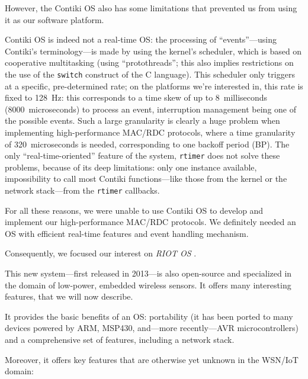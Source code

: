 \documentclass[a4paper,twoside]{article}
\begin{document}
\bigskip

However, the Contiki OS also has some limitations that prevented us from
using it as our software platform.

Contiki OS is indeed not a real-time OS: the processing of ``events''---using
Contiki's terminology---is made by using the kernel's scheduler, which is
based on cooperative multitasking (using ``protothreads''; this also implies
restrictions on the use of the \texttt{switch} construct of the C language).
This scheduler only triggers at a specific, pre-determined rate; on
the platforms we're interested in, this rate is fixed to 128~Hz:
this corresponds to a time skew of up to 8~milliseconds
(8000~microseconds) to process an event, interruption management being
one of the possible events. Such a large granularity is clearly
a huge problem when implementing high-performance MAC/RDC protocols,
where a time granularity of 320~microseconds is needed, corresponding
to one backoff period (BP). The only ``real-time-oriented'' feature
of the system, \texttt{rtimer} does not solve these problems, because
of its deep limitations: only one instance available, impossibility
to call most Contiki functions---like those from the kernel or
the network stack---from the \texttt{rtimer} callbacks.

For all these reasons, we were unable to use Contiki OS to develop and
implement our high-performance MAC/RDC protocols. We definitely needed
an OS with efficient real-time features and event handling mechanism.

\bigskip

Consequently, we focused our interest on \emph{RIOT OS} \cite{RIOT}.

This new system---first released in 2013---is also open-source and
specialized in the domain of low-power, embedded wireless sensors.
It offers many interesting features, that we will now describe.

It provides the basic benefits of an OS: portability (it has been ported
to many devices powered by ARM, MSP430, and---more recently---AVR
microcontrollers) and a comprehensive set of features, including
a network stack.

Moreover, it offers key features that are otherwise yet unknown in
the WSN/IoT domain:
\end{document}
